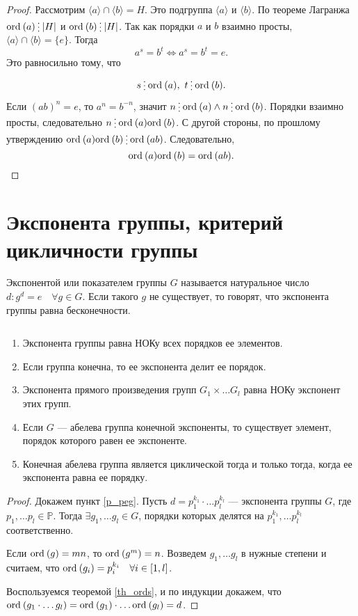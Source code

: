 \documentclass[11pt]{book}
\newcommand{\Pm}{\mathbb{P}}
\newcommand{\ord}{{\mathop{\text{\rm ord}}\:}}
\newcommand{\del}{{\:\small \raisebox{-2pt}{\vdots}\:}}
\theoremstyle{definition}
\theoremstyle{plain}
\theoremstyle{plain}
\theoremstyle{definition}
\theoremstyle{remark}
\begin{document}
\begin{proof}
    Рассмотрим $ \langle a \rangle \cap \langle b \rangle  = H$. Это подгруппа $ \langle a \rangle$ и $ \langle b \rangle$. По теореме Лагранжа $ \ord (a) \del |H|$ и $ \ord (b) \del |H|$.
    Так как порядки $ a$ и  $ b$ взаимно просты, $ \langle a \rangle \cap \langle  b \rangle = \{e\}$. Тогда
    \[
	a^{s} = b^{t} \Longleftrightarrow a^{s} = b^{t} = e
    .\]
    Это равносильно тому, что
    \[
	s \del \ord(a), ~ t \del \ord(b)
    .\]
    Если $ (ab)^{n} = e$, то $ a^{n} = b^{-n}$, значит $ n \del\ord(a) \wedge n \del \ord(b)$. Порядки взаимно просты, следовательно $ n \del \ord(a)\ord(b)$. С другой стороны, по прошлому утверждению  $ \ord(a)\ord(b) \del \ord(ab)$. Следовательно,  \[
	\ord(a)\ord(b) = \ord(ab)
    .\]
\end{proof}
\section{Экспонента группы, критерий цикличности группы}
\begin{defn}
    {\sf Экспонентой} или {\sf показателем} группы $ G$ называется натуральное число  $ d: g^{d} = e \quad \forall g \in G$. Если такого $ g$ не существует, то говорят, что экспонента группы равна бесконечности.
\end{defn}
\begin{thm}
    $ $
    \begin{enumerate}[noitemsep,label={\rm (\arabic*)}]
	\item Экспонента группы равна НОКу всех порядков ее элементов.
	\item Если группа конечна, то ее экспонента делит ее порядок.
	\item Экспонента прямого произведения групп $ G_1\times \ldots G_l$ равна НОКу экспонент этих групп.
	\item \label{p_peg}Если $ G$ --- абелева группа конечной экспоненты, то существует элемент, порядок которого равен ее экспоненте.
	\item Конечная абелева группа является циклической  тогда и только тогда, когда ее экспонента равна ее порядку.
    \end{enumerate}
\end{thm}
\begin{proof}
    Докажем пункт \ref{p_peg}. Пусть $ d = p_1^{k_1} \cdot  \ldots p_l^{k_l}$ --- экспонента группы $ G$, где  $ p_1, \ldots p_l \in \Pm$. Тогда $ \exists  g_1, \ldots g_l \in G$, порядки которых делятся на $ p_1^{k_1}, \ldots p_l^{k_l}$ соответственно.

    Если $ \ord(g) = mn$, то  $ \ord (g^{m}) = n$. Возведем $ g_1, \ldots g_l$ в нужные степени и считаем, что $ \ord(g_i) = p_{i}^{k_i} \quad \forall  i \in [1, l]$.

    Воспользуемся теоремой \ref{th_ords}, и по индукции докажем, что $ \ord(g_1\cdot  \ldots g_l) = \ord(g_1) \cdot  \ldots \ord(g_l) = d$.
\end{proof}
\end{document}
